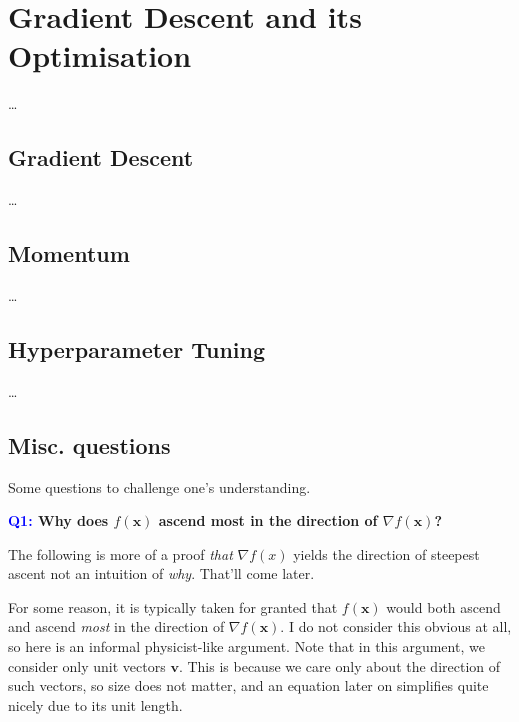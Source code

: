 \documentclass[11pt]{article}
\begin{document}
\section{Gradient Descent and its Optimisation}
\dots

\subsection{Gradient Descent}
\dots

\subsection{Momentum}
\dots

\subsection{Hyperparameter Tuning}
\dots

\subsection{Misc. questions}

Some questions to challenge one's understanding.

\begin{center}
    \textbf{\textcolor{blue}{Q1:} Why does $f(\mathbf{x})$ ascend most in the direction of $\nabla f(\mathbf{x})$?}
\end{center}

\noindent The following is more of a proof \textit{that} $\nabla f(x)$ yields the direction of steepest ascent not an intuition of \textit{why}. That'll come later.

For some reason, it is typically taken for granted that $f(\mathbf{x})$ would both ascend and ascend \textit{most} in the direction of $\nabla f(\mathbf{x})$. I do not consider this obvious at all, so here is an informal physicist-like argument. Note that in this argument, we consider only unit vectors $\mathbf{v}$. This is because we care only about the direction of such vectors, so size does not matter, and an equation later on simplifies quite nicely due to its unit length. 
\end{document}
